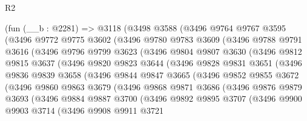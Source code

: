 \begin{lexlean}{R2}
\begin{coremodule}
    (fun (__b : @2281) =>
    @3118
      (@3498
        @3588
        (@3496
          @9764
          @9767
          @3595
          (@3496
            @9772
            @9775
            @3602
            (@3496
              @9780
              @9783
              @3609
              (@3496
                @9788
                @9791
                @3616
                (@3496
                  @9796
                  @9799
                  @3623
                  (@3496
                    @9804
                    @9807
                    @3630
                    (@3496
                      @9812
                      @9815
                      @3637
                      (@3496
                        @9820
                        @9823
                        @3644
                        (@3496
                          @9828
                          @9831
                          @3651
                          (@3496
                            @9836
                            @9839
                            @3658
                            (@3496
                              @9844
                              @9847
                              @3665
                              (@3496
                                @9852
                                @9855
                                @3672
                                (@3496
                                  @9860
                                  @9863
                                  @3679
                                  (@3496
                                    @9868
                                    @9871
                                    @3686
                                    (@3496
                                      @9876
                                      @9879
                                      @3693
                                      (@3496
                                        @9884
                                        @9887
                                        @3700
                                        (@3496
                                          @9892
                                          @9895
                                          @3707
                                          (@3496
                                            @9900
                                            @9903
                                            @3714
                                            (@3496
                                              @9908
                                              @9911
                                              @3721

\end{coremodule}
\end{lexlean}
